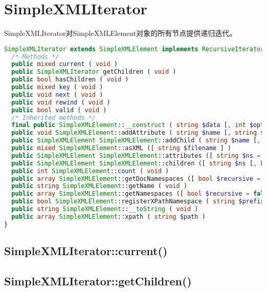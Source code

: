\section{SimpleXMLIterator}



SimpleXMLIterator对SimpleXMLElement对象的所有节点提供递归迭代。













\begin{lstlisting}[language=PHP]
SimpleXMLIterator extends SimpleXMLElement implements RecursiveIterator , Countable {
  /* Methods */
  public mixed current ( void )
  public SimpleXMLIterator getChildren ( void )
  public bool hasChildren ( void )
  public mixed key ( void )
  public void next ( void )
  public void rewind ( void )
  public bool valid ( void )
  /* Inherited methods */
  final public SimpleXMLElement::__construct ( string $data [, int $options = 0 [, bool $data_is_url = false [, string $ns = "" [, bool $is_prefix = false ]]]] )
  public void SimpleXMLElement::addAttribute ( string $name [, string $value [, string $namespace ]] )
  public SimpleXMLElement SimpleXMLElement::addChild ( string $name [, string $value [, string $namespace ]] )
  public mixed SimpleXMLElement::asXML ([ string $filename ] )
  public SimpleXMLElement SimpleXMLElement::attributes ([ string $ns = NULL [, bool $is_prefix = false ]] )
  public SimpleXMLElement SimpleXMLElement::children ([ string $ns [, bool $is_prefix = false ]] )
  public int SimpleXMLElement::count ( void )
  public array SimpleXMLElement::getDocNamespaces ([ bool $recursive = false [, bool $from_root = true ]] )
  public string SimpleXMLElement::getName ( void )
  public array SimpleXMLElement::getNamespaces ([ bool $recursive = false ] )
  public bool SimpleXMLElement::registerXPathNamespace ( string $prefix , string $ns )
  public string SimpleXMLElement::__toString ( void )
  public array SimpleXMLElement::xpath ( string $path )
}
\end{lstlisting}

\subsection{SimpleXMLIterator::current()}



\subsection{SimpleXMLIterator::getChildren()}


